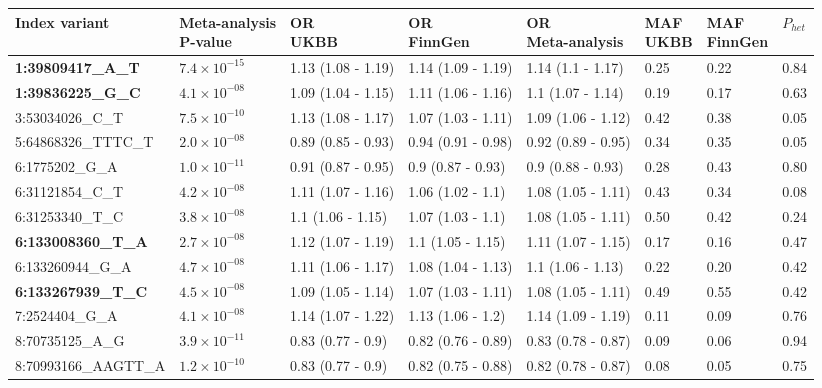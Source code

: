 \begin{table}[H]
\begin{adjustwidth}{-.5in}{-.5in}
\begin{tabular}[t]{p{}llllp{}p{}p{}}
      \toprule
      Index variant & \makecell{Meta-analysis\\P-value} & \makecell{OR\\UKBB} & \makecell{OR\\FinnGen} & \makecell{OR\\ Meta-analysis} & \makecell{MAF\\UKBB} & \makecell{MAF\\FinnGen} & $P_{het}$\\
      \midrule
      \textbf{1:39809417\_A\_T} & $7.4\times10^{-15}$ & 1.13 (1.08 - 1.19) & 1.14 (1.09 - 1.19) & 1.14 (1.1 - 1.17) & 0.25 & 0.22 & 0.84\\
      \textbf{1:39836225\_G\_C} & $4.1\times10^{-08}$ & 1.09 (1.04 - 1.15) & 1.11 (1.06 - 1.16) & 1.1 (1.07 - 1.14) & 0.19 & 0.17 & 0.63\\
      3:53034026\_C\_T & $7.5\times10^{-10}$ & 1.13 (1.08 - 1.17) & 1.07 (1.03 - 1.11) & 1.09 (1.06 - 1.12) & 0.42 & 0.38 & 0.05\\
      5:64868326\_TTTC\_T & $2.0\times10^{-08}$ & 0.89 (0.85 - 0.93) & 0.94 (0.91 - 0.98) & 0.92 (0.89 - 0.95) & 0.34 & 0.35 & 0.05\\
      6:1775202\_G\_A & $1.0\times10^{-11}$ & 0.91 (0.87 - 0.95) & 0.9 (0.87 - 0.93) & 0.9 (0.88 - 0.93) & 0.28 & 0.43 & 0.80\\
      6:31121854\_C\_T & $4.2\times10^{-08}$ & 1.11 (1.07 - 1.16) & 1.06 (1.02 - 1.1) & 1.08 (1.05 - 1.11) & 0.43 & 0.34 & 0.08\\
      6:31253340\_T\_C & $3.8\times10^{-08}$ & 1.1 (1.06 - 1.15) & 1.07 (1.03 - 1.1) & 1.08 (1.05 - 1.11) & 0.50 & 0.42 & 0.24\\
      \textbf{6:133008360\_T\_A} & $2.7\times10^{-08}$ & 1.12 (1.07 - 1.19) & 1.1 (1.05 - 1.15) & 1.11 (1.07 - 1.15) & 0.17 & 0.16 & 0.47\\
      6:133260944\_G\_A & $4.7\times10^{-08}$ & 1.11 (1.06 - 1.17) & 1.08 (1.04 - 1.13) & 1.1 (1.06 - 1.13) & 0.22 & 0.20 & 0.42\\
      \textbf{6:133267939\_T\_C} & $4.5\times10^{-08}$ & 1.09 (1.05 - 1.14) & 1.07 (1.03 - 1.11) & 1.08 (1.05 - 1.11) & 0.49 & 0.55 & 0.42\\
      7:2524404\_G\_A & $4.1\times10^{-08}$ & 1.14 (1.07 - 1.22) & 1.13 (1.06 - 1.2) & 1.14 (1.09 - 1.19) & 0.11 & 0.09 & 0.76\\
      8:70735125\_A\_G & $3.9\times10^{-11}$ & 0.83 (0.77 - 0.9) & 0.82 (0.76 - 0.89) & 0.83 (0.78 - 0.87) & 0.09 & 0.06 & 0.94\\
      8:70993166\_AAGTT\_A & $1.2\times10^{-10}$ & 0.83 (0.77 - 0.9) & 0.82 (0.75 - 0.88) & 0.82 (0.78 - 0.87) & 0.08 & 0.05 & 0.75\\

\end{tabular}
\end{adjustwidth}
\end{table}
